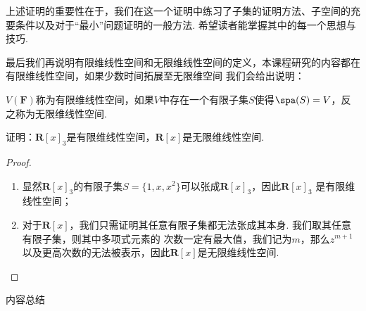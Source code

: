 上述证明的重要性在于，我们在这一个证明中练习了子集的证明方法、子空间的充要条件以及对于``最小''问题证明的一般方法.
希望读者能掌握其中的每一个思想与技巧.

最后我们再说明有限维线性空间和无限维线性空间的定义，本课程研究的内容都在有限维线性空间，如果少数时间拓展至无限维空间
我们会给出说明：
\begin{definition}
    $V(\mathbf{F})$称为有限维线性空间，如果$V$中存在一个有限子集$S$使得$\spa(S)=V$，反之称为无限维线性空间.
\end{definition}
\begin{example}
    证明：$\mathbf{R}[x]_3$是有限维线性空间，$\mathbf{R}[x]$是无限维线性空间.
\end{example}
\begin{proof}
    \begin{enumerate}
        \item 显然$\mathbf{R}[x]_3$的有限子集$S=\{1,x,x^2\}$可以张成$\mathbf{R}[x]_3$，因此$\mathbf{R}[x]_3$
        是有限维线性空间；
        \item 对于$\mathbf{R}[x]$，我们只需证明其任意有限子集都无法张成其本身. 我们取其任意有限子集，则其中多项式元素的
        次数一定有最大值，我们记为$m$，那么$z^{m+1}$以及更高次数的无法被表示，因此$\mathbf{R}[x]$是无限维线性空间.
    \end{enumerate}
\end{proof}

\vspace{2ex}
\centerline{\heiti \Large 内容总结}

\vspace{2ex}

